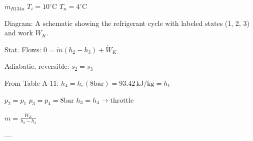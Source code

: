 \( \dot{m}_{R134a} \)  
\( T_i = 10^\circ \text{C} \)  
\( T_n = 4^\circ \text{C} \)  

Diagram: A schematic showing the refrigerant cycle with labeled states (1, 2, 3) and work \( \dot{W}_K \).  

Stat. Flows:  
\( 0 = \dot{m} (h_2 - h_3) + \dot{W}_K \)  

Adiabatic, reversible: \( s_2 = s_3 \)  

From Table A-11:  
\( h_4 = h_{e}(8 \text{bar}) = 93.42 \, \text{kJ/kg} = h_1 \)  

\( p_2 = p_1 \)  
\( p_3 = p_4 = 8 \text{bar} \)  
\( h_3 = h_4 \rightarrow \text{throttle} \)  

\( \dot{m} = \frac{\dot{W}_K}{h_2 - h_3} \)  

---